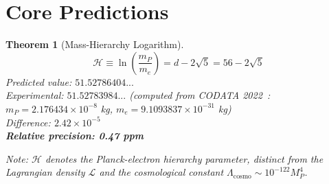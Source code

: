 \documentclass[11pt,a4paper]{article}
\newtheorem{theorem}{Theorem}
\begin{document}
\section{Core Predictions}

\begin{theorem}[Mass-Hierarchy Logarithm]
\begin{equation}
\mathcal{H} \equiv \ln\left(\frac{m_P}{m_e}\right) = d - 2\sqrt{5} = 56 - 2\sqrt{5}
\end{equation}
Predicted value: $51.52786404...$\\
Experimental: $51.52783984...$ (computed from CODATA 2022~\cite{CODATA2022}: $m_P = 2.176434 \times 10^{-8}$ kg, $m_e = 9.1093837 \times 10^{-31}$ kg)\\
Difference: $2.42 \times 10^{-5}$\\
\textbf{Relative precision: 0.47 ppm}

\textit{Note}: $\mathcal{H}$ denotes the Planck-electron hierarchy parameter, distinct from the Lagrangian density $\mathcal{L}$ and the cosmological constant $\Lambda_{\text{cosmo}} \sim 10^{-122} M_P^4$.
\end{theorem}
\end{document}

